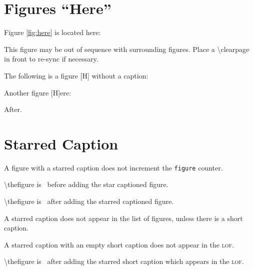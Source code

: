 \documentclass{article}
\newcommand{\cs}[1]{\textsf{\textbackslash#1}}
\newcommand{\acro}[1]{\textsc{\MakeLowercase{#1}}}
\begin{document}



\clearpage



\section{Figures ``Here''}


Figure \ref{fig:here} is located here:


This figure may be out of sequence with surrounding figures.
Place a \cs{clearpage} in front to re-sync if necessary.


The following is a figure [H] without a caption:


Another figure [H]ere:


After.


\clearpage


\section{Starred Caption}

A figure with a starred caption does not increment the \texttt{figure} counter.

\cs{thefigure} is \thefigure\ before adding the star captioned figure.



\cs{thefigure} is \thefigure\ after adding the starred captioned figure.

A starred caption does not appear in the list of figures, unless there is a short caption.



A starred caption with an empty short caption does not appear in the \acro{LOF}.


\cs{thefigure} is \thefigure\ after adding the starred short caption which appears in the \acro{LOF}.
\end{document}

